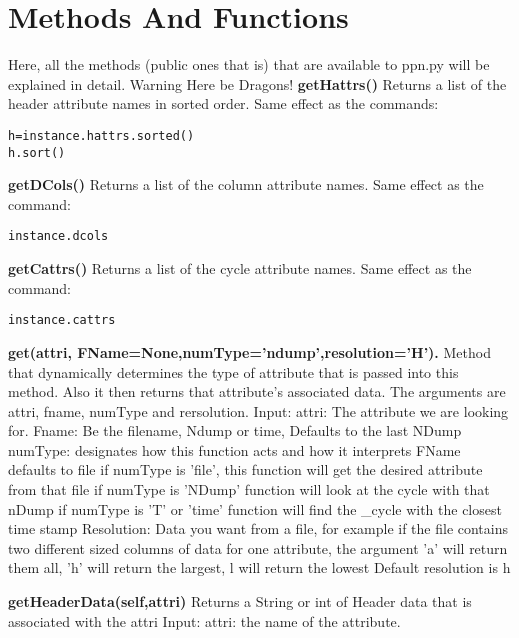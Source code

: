 \section{Methods And Functions}
Here, all the methods (public ones that is) that are available to ppn.py will be explained in detail.  Warning Here be Dragons!
\newline
{\bf getHattrs()}
Returns a list of the header attribute names in sorted order. Same effect as the commands:
\begin{verbatim}
h=instance.hattrs.sorted()
h.sort()
\end{verbatim}
{\bf getDCols()}
Returns a list of the column attribute names. Same effect as the command:
\begin{verbatim}
instance.dcols
\end{verbatim}
{\bf getCattrs()}
Returns a list of the cycle attribute names. Same effect as the command:
\begin{verbatim}
instance.cattrs
\end{verbatim}

{\bf get(attri, FName=None,numType='ndump',resolution='H').}
\newline  
Method that dynamically determines the type of attribute that is 
passed into this method. Also it then returns that attribute's 
associated data.
The arguments are attri, fname, numType and rersolution.
Input: \newline
attri: The attribute we are looking for.\newline
Fname: Be the filename, Ndump or time, Defaults to the last NDump\newline
numType: designates how this function acts and how it interprets FName
defaults to file\newline
if numType is 'file', this function will get the desired attribute from
that file\newline
if numType is 'NDump' function will look at the cycle with that nDump\newline
if numType is 'T' or 'time' function will find the \_cycle with the 
closest time stamp\newline
Resolution: Data you want from a file, for example if the file 
contains two different sized columns of data for one attribute, the 
argument 'a' will return them all,
'h' will return the largest,
l will return the lowest
Default resolution is h\newline


{\bf getHeaderData(self,attri)}
\newline 
Returns a String or int of Header data that is associated with the attri
\newline
Input: \newline attri: the name of the attribute.\newline


